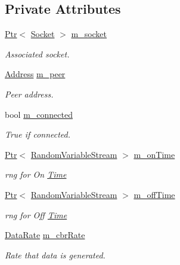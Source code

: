 \subsection*{Private Attributes}
\begin{DoxyCompactItemize}
\item 
\hyperlink{classns3_1_1Ptr}{Ptr}$<$ \hyperlink{classns3_1_1Socket}{Socket} $>$ \hyperlink{classns3_1_1OnOffApplication_a287a8fccd676716df73ed4f207ed5c58}{m\+\_\+socket}
\begin{DoxyCompactList}\small\item\em Associated socket. \end{DoxyCompactList}\item 
\hyperlink{classns3_1_1Address}{Address} \hyperlink{classns3_1_1OnOffApplication_af68738cdff7818215c8e4cb0f8e5c9e9}{m\+\_\+peer}
\begin{DoxyCompactList}\small\item\em Peer address. \end{DoxyCompactList}\item 
bool \hyperlink{classns3_1_1OnOffApplication_a232122e7bfefaf01debf80f61621ed1e}{m\+\_\+connected}
\begin{DoxyCompactList}\small\item\em True if connected. \end{DoxyCompactList}\item 
\hyperlink{classns3_1_1Ptr}{Ptr}$<$ \hyperlink{classns3_1_1RandomVariableStream}{Random\+Variable\+Stream} $>$ \hyperlink{classns3_1_1OnOffApplication_ad09b299b329d726d30071006bf0496e8}{m\+\_\+on\+Time}
\begin{DoxyCompactList}\small\item\em rng for On \hyperlink{classns3_1_1Time}{Time} \end{DoxyCompactList}\item 
\hyperlink{classns3_1_1Ptr}{Ptr}$<$ \hyperlink{classns3_1_1RandomVariableStream}{Random\+Variable\+Stream} $>$ \hyperlink{classns3_1_1OnOffApplication_a3af5f592828037a47f079bb97bb05654}{m\+\_\+off\+Time}
\begin{DoxyCompactList}\small\item\em rng for Off \hyperlink{classns3_1_1Time}{Time} \end{DoxyCompactList}\item 
\hyperlink{classns3_1_1DataRate}{Data\+Rate} \hyperlink{classns3_1_1OnOffApplication_ae81a8be6c1ce4bef91e89cc2c44e5bcf}{m\+\_\+cbr\+Rate}
\begin{DoxyCompactList}\small\item\em Rate that data is generated. \end{DoxyCompactList}\item 

\end{DoxyCompactItemize}
